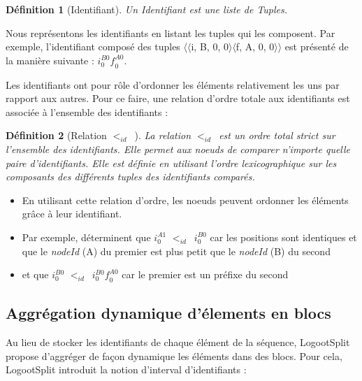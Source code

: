 \documentclass[12pt]{thesul}
\newtheorem{definition}{Définition}
\newcommand{\trm}[1]{\mathit{#1}}
\newcommand{\id}[3]{$\trm{#1}^{\trm{#2}}_{\trm{#3}}$}
\newcommand{\lid}{$<_{id}$~}
\begin{document}
\begin{definition}[Identifiant]
  Un \emph{Identifiant} est une liste de \emph{Tuples}.
\end{definition}


Nous représentons les identifiants en listant les tuples qui les composent.
Par exemple, l'identifiant composé des tuples $\langle\langle$i, B, 0, 0$\rangle\langle$f, A, 0, 0$\rangle\rangle$ est présenté de la manière suivante : \id{i}{B0}{0}\id{f}{A0}{0}.

Les identifiants ont pour rôle d'ordonner les éléments relativement les uns par rapport aux autres.
Pour ce faire, une relation d'ordre totale aux identifiants est associée à l'ensemble des identifiants :

\begin{definition}[Relation \lid]
  La relation \lid est un ordre total strict sur l'ensemble des identifiants.
  Elle permet aux noeuds de comparer n'importe quelle paire d'identifiants.
  Elle est définie en utilisant l'ordre lexicographique sur les composants des différents tuples des identifiants comparés.
\end{definition}

\begin{itemize}
  \item En utilisant cette relation d'ordre, les noeuds peuvent ordonner les éléments grâce à leur identifiant.
  \item Par exemple, déterminent que \id{i}{A1}{0} \lid \id{i}{B0}{0} car les positions sont identiques et que le \emph{nodeId} (A) du premier est plus petit que le \emph{nodeId} (B) du second
  \item et que \id{i}{B0}{0} \lid \id{i}{B0}{0}\id{f}{A0}{0} car le premier est un préfixe du second
\end{itemize}


\subsection{Aggrégation dynamique d'élements en blocs}

\label{sec:blocs}

Au lieu de stocker les identifiants de chaque élément de la séquence, LogootSplit propose d'aggréger de façon dynamique les éléments dans des blocs.
Pour cela, LogootSplit introduit la notion d'interval d'identifiants :
\end{document}
